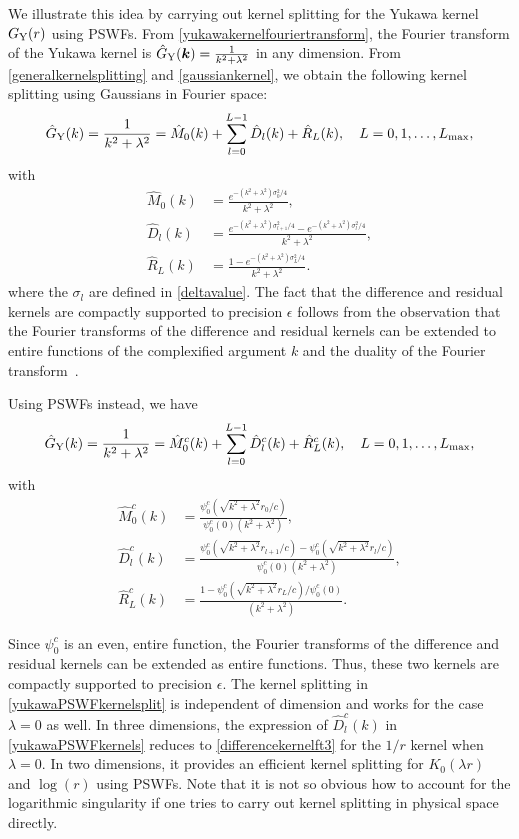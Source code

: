 \documentclass[final,letterpaper]{siamart171218}
\newcommand{\be}{\begin{equation}}
\newcommand{\ee}{\end{equation}}
\newcommand{\ba}{\begin{aligned}}
\newcommand{\ea}{\end{aligned}}
\newcommand{\bk}{\boldsymbol{k}}
\newcommand{\psic}{{\psi_0^c}}
\newcommand{\cR}{r}
\begin{document}
We illustrate this idea by carrying out kernel splitting for the Yukawa kernel 
$G_{\rm Y}(r)$ using PSWFs. From \cref{yukawakernelfouriertransform}, the Fourier transform
of the Yukawa kernel is $\hat{G}_{\rm Y}(\bk)=\frac{1}{k^2+\lambda^2}$ in any dimension.
From  \cref{generalkernelsplitting} and \cref{gaussiankernel}, we obtain
the following kernel splitting using Gaussians in Fourier space:
\be\label{yukawagaussiankernelsplit}
\hat{G}_{\rm Y}(k)=\frac{1}{k^2+\lambda^2}
=\hat{M}_{0}(k)+\sum_{l=0}^{L-1}\hat{D}_l(k)+\hat{R}_L(k), \quad L=0,1,\ldots,L_{\rm max},
\ee
with
\be\label{yukawagaussiankernels}
\ba
\hat{M}_{0}(k)&=\frac{e^{-(k^2+\lambda^2)\sigma_0^2/4}}{k^2+\lambda^2},\\
\hat{D}_l(k)&=\frac{e^{-(k^2+\lambda^2)\sigma_{l+1}^2/4}-e^{-(k^2+\lambda^2)\sigma_l^2/4}}
    {k^2+\lambda^2},\\
\hat{R}_L(k)&=\frac{1-e^{-(k^2+\lambda^2)\sigma_L^2/4}}
    {k^2+\lambda^2}.
\ea
\ee
where the $\sigma_l$ are defined in \eqref{deltavalue}.
The fact that the difference and residual kernels are compactly supported to precision 
$\epsilon$ follows from the observation that
the Fourier transforms of the difference and residual kernels
can be extended to entire functions of the complexified argument $k$ and the duality
of the Fourier transform~\cite[Theorem 1 on pp. 30]{trefethen2000}.

Using PSWFs instead, we have
\be\label{yukawaPSWFkernelsplit}
\hat{G}_{\rm Y}(k)=\frac{1}{k^2+\lambda^2}
=\hat{M}^c_{0}(k)+\sum_{l=0}^{L-1}\hat{D}^c_l(k)+\hat{R}^c_L(k), \quad L=0,1,\ldots,L_{\rm max},
\ee
with
\be\label{yukawaPSWFkernels}
\ba
\hat{M}^c_{0}(k)&=\frac{\psic\left(\sqrt{k^2+\lambda^2}\cR_0/c\right)}{\psic(0)(k^2+\lambda^2)},\\
\hat{D}^c_l(k)&=\frac{\psic\left(\sqrt{k^2+\lambda^2}\cR_{l+1}/c\right)
  -\psic\left(\sqrt{k^2+\lambda^2}\cR_l/c\right)}
    {\psic(0)(k^2+\lambda^2)},\\
\hat{R}^c_L(k)&=\frac{1-\psic\left(\sqrt{k^2+\lambda^2}\cR_L/c\right)/\psic(0)}
    {(k^2+\lambda^2)}.
\ea
\ee

Since $\psic$ is an even, entire function, the Fourier transforms of the difference and residual
kernels can be extended as entire functions. Thus, these two kernels are 
compactly supported to precision $\epsilon$. 
The kernel splitting in \cref{yukawaPSWFkernelsplit} is independent of
dimension and works for the case $\lambda=0$ as well. In three dimensions, the expression of
$\hat{D}^c_l(k)$ in \cref{yukawaPSWFkernels} reduces to \cref{differencekernelft3}
for the $1/r$ kernel when $\lambda=0$. In two dimensions, it provides an efficient
kernel splitting for $K_0(\lambda r)$ and $\log(r)$ using PSWFs. Note that
it is not so obvious how to account for the logarithmic singularity
if one tries to carry out kernel splitting in physical space directly.
\end{document}
